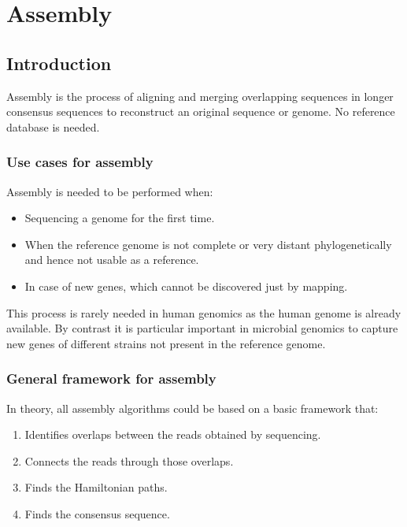 \graphicspath{{chapters/images/06/}}
\chapter{Assembly}

\section{Introduction}
Assembly is the process of aligning and merging overlapping sequences in longer consensus sequences to reconstruct an original sequence or genome.
No reference database is needed.

    \subsection{Use cases for assembly}
    Assembly is needed to be performed when:

    \begin{multicols}{2}
        \begin{itemize}
            \item Sequencing a genome for the first time.
            \item When the reference genome is not complete or very distant phylogenetically and hence not usable as a reference.
            \item In case of new genes, which cannot be discovered just by mapping.
        \end{itemize}
    \end{multicols}

    This process is rarely needed in human genomics as the human genome is already available.
    By contrast it is particular important in microbial genomics to capture new genes of different strains not present in the reference genome.

    \subsection{General framework for assembly}
    In theory, all assembly algorithms could be based on a basic framework that:

    \begin{multicols}{2}
        \begin{enumerate}
            \item Identifies overlaps between the reads obtained by sequencing.
            \item Connects the reads through those overlaps.
            \item Finds the Hamiltonian paths.
            \item Finds the consensus sequence.
        \end{enumerate}
    \end{multicols}

